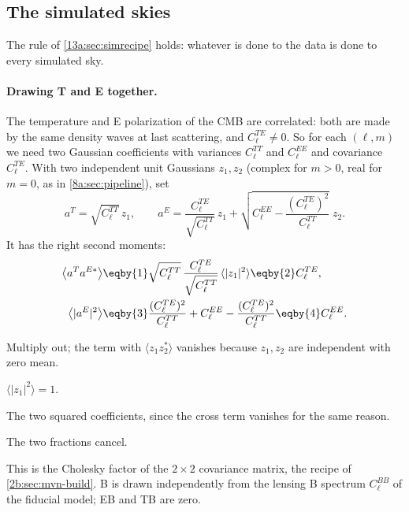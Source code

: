 \subsection{The simulated skies}
\label{13e:sec:sims}

The rule of \cref{13a:sec:simrecipe} holds: whatever is done to the data is done to every simulated sky.

\paragraph{Drawing T and E together.} The temperature and E polarization of the CMB are correlated: both
are made by the same density waves at last scattering, and $C^{TE}_\ell\ne0$. So for each $(\ell,m)$ we need
two Gaussian coefficients with variances $C^{TT}_\ell$ and $C^{EE}_\ell$ and covariance $C^{TE}_\ell$. With two
independent unit Gaussians $z_1,z_2$ (complex for $m>0$, real for $m=0$, as in \cref{8a:sec:pipeline}), set
\begin{equation}
  a^T=\sqrt{C^{TT}_\ell}\,z_1,\qquad a^E=\frac{C^{TE}_\ell}{\sqrt{C^{TT}_\ell}}\,z_1+\sqrt{C^{EE}_\ell-\frac{(C^{TE}_\ell)^2}{C^{TT}_\ell}}\;z_2 .
  \label{13e:eq:te-draw}
\end{equation}
It has the right second moments:
\begin{align}
  \bigl\langle a^Ta^{E*}\bigr\rangle
  &\eqby{1}\sqrt{C^{TT}_\ell}\,\frac{C^{TE}_\ell}{\sqrt{C^{TT}_\ell}}\,\langle|z_1|^2\rangle
   \eqby{2}C^{TE}_\ell,
  \nonumber\\
  \bigl\langle|a^E|^2\bigr\rangle
  &\eqby{3}\frac{(C^{TE}_\ell)^2}{C^{TT}_\ell}+C^{EE}_\ell-\frac{(C^{TE}_\ell)^2}{C^{TT}_\ell}
   \eqby{4}C^{EE}_\ell .
\end{align}
\begin{explain}
  \item Multiply out; the term with $\langle z_1z_2^*\rangle$ vanishes because $z_1,z_2$ are independent with zero mean.
  \item $\langle|z_1|^2\rangle=1$.
  \item The two squared coefficients, since the cross term vanishes for the same reason.
  \item The two fractions cancel.
\end{explain}
This is the Cholesky factor of the $2\times2$ covariance matrix, the recipe of \cref{2b:sec:mvn-build}. B is
drawn independently from the lensing B spectrum $C^{BB}_\ell$ of the fiducial model; EB and TB are zero.

